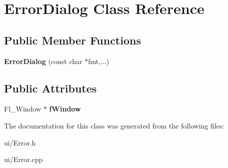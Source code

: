 \hypertarget{classErrorDialog}{\section{\-Error\-Dialog \-Class \-Reference}
\label{classErrorDialog}
}
\subsection*{\-Public \-Member \-Functions}
\begin{DoxyCompactItemize}
\item 
\hypertarget{classErrorDialog_ac1600da1b1415a1f66fc47f5c335e733}{{\bfseries \-Error\-Dialog} (const char $\ast$fmt,...)}\label{classErrorDialog_ac1600da1b1415a1f66fc47f5c335e733}

\end{DoxyCompactItemize}
\subsection*{\-Public \-Attributes}
\begin{DoxyCompactItemize}
\item 
\hypertarget{classErrorDialog_a07171f99468eb28b4f7792e5ded30607}{\-Fl\-\_\-\-Window $\ast$ {\bfseries f\-Window}}\label{classErrorDialog_a07171f99468eb28b4f7792e5ded30607}

\end{DoxyCompactItemize}


\-The documentation for this class was generated from the following files\-:\begin{DoxyCompactItemize}
\item 
ui/\-Error.\-h\item 
ui/\-Error.\-cpp\end{DoxyCompactItemize}
